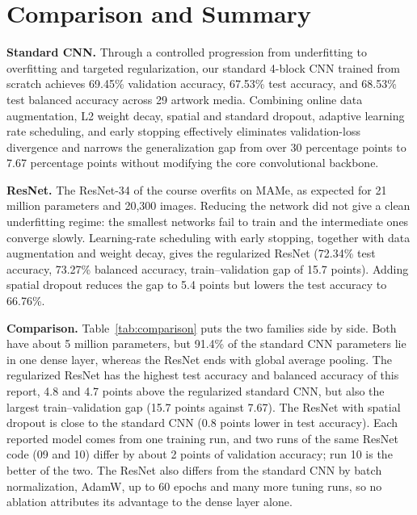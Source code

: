 \documentclass[11pt, a4paper]{article}
\begin{document}
\section{Comparison and Summary}
\label{sec:summary}

\textbf{Standard CNN.} Through a controlled progression from underfitting to overfitting and targeted regularization, our standard 4-block CNN trained from scratch achieves 69.45\% validation accuracy, 67.53\% test accuracy, and 68.53\% test balanced accuracy across 29 artwork media. Combining online data augmentation, L2 weight decay, spatial and standard dropout, adaptive learning rate scheduling, and early stopping effectively eliminates validation-loss divergence and narrows the generalization gap from over 30 percentage points to 7.67 percentage points without modifying the core convolutional backbone.

\textbf{ResNet.} The ResNet-34 of the course overfits on MAMe, as expected for 21 million parameters and 20,300 images. Reducing the network did not give a clean underfitting regime: the smallest networks fail to train and the intermediate ones converge slowly. Learning-rate scheduling with early stopping, together with data augmentation and weight decay, gives the regularized ResNet (72.34\% test accuracy, 73.27\% balanced accuracy, train--validation gap of 15.7 points). Adding spatial dropout reduces the gap to 5.4 points but lowers the test accuracy to 66.76\%.

\textbf{Comparison.} Table~\ref{tab:comparison} puts the two families side by side. Both have about 5 million parameters, but 91.4\% of the standard CNN parameters lie in one dense layer, whereas the ResNet ends with global average pooling. The regularized ResNet has the highest test accuracy and balanced accuracy of this report, 4.8 and 4.7 points above the regularized standard CNN, but also the largest train--validation gap (15.7 points against 7.67). The ResNet with spatial dropout is close to the standard CNN (0.8 points lower in test accuracy). Each reported model comes from one training run, and two runs of the same ResNet code (09 and 10) differ by about 2 points of validation accuracy; run 10 is the better of the two. The ResNet also differs from the standard CNN by batch normalization, AdamW, up to 60 epochs and many more tuning runs, so no ablation attributes its advantage to the dense layer alone.
\end{document}
